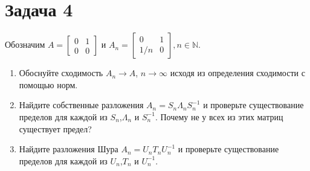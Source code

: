 \documentclass{article}
\begin{document}
	\section*{Задача 4}
	Обозначим $A = \begin{bmatrix}0 & 1 \\ 0 & 0 \end{bmatrix}$ и $A_n = \begin{bmatrix} 0 & 1 \\ 1/n & 0 \end{bmatrix}, n\in\mathbb{N}$.
	\begin{enumerate}
		\item Обоснуйте сходимость $A_n\to A$, $n\to\infty$ исходя из определения сходимости с помощью норм.
		\item Найдите собственные разложения $A_n = S_n \Lambda_n S_n^{-1}$ и проверьте существование пределов для каждой из $S_n$,$\Lambda_n$ и $S_n^{-1}$. Почему не у всех из этих матриц существует предел?
		\item Найдите разложения Шура $A_n = U_n T_n U_n^{-1}$ и проверьте существование пределов для каждой из $U_n$,$T_n$ и $U_n^{-1}$.
	\end{enumerate}
\end{document}
